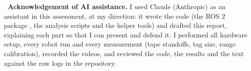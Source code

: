 \begin{notebox}
\small\textbf{\color{kfupmdark}\faLightbulb\ Acknowledgement of AI assistance.}
I used Claude (Anthropic) as an assistant in this assessment, at my direction: it wrote the code (the ROS 2 package
, the analysis scripts and the helper tools) and drafted this report, explaining each part so
that I can present and defend it. I performed all hardware setup, every robot run and every measurement (tape
standoffs, tag size, range calibration), recorded the videos, and reviewed the code, the results and the text against
the raw logs in the repository.
\end{notebox}
